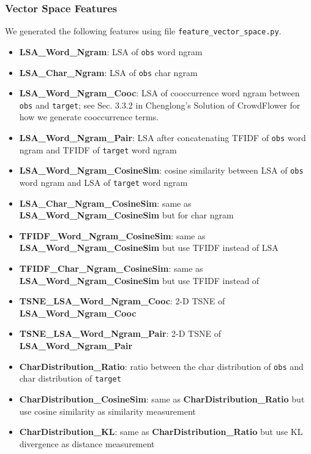 \documentclass[12pt]{article}
\begin{document}
\subsubsection{Vector Space Features}
We generated the following features using file \texttt{feature\_vector\_space.py}.
\begin{itemize}
\item \textbf{LSA\_Word\_Ngram}: LSA of \texttt{obs} word ngram
\item \textbf{LSA\_Char\_Ngram}: LSA of \texttt{obs} char ngram
\item \textbf{LSA\_Word\_Ngram\_Cooc}: LSA of cooccurrence word ngram between \texttt{obs} and \texttt{target}; see Sec. 3.3.2 in Chenglong's Solution of CrowdFlower\cite{CrowdFlower_1st} for how we generate cooccurrence terms.
\item \textbf{LSA\_Word\_Ngram\_Pair}: LSA after concatenating TFIDF of \texttt{obs} word ngram and TFIDF of \texttt{target} word ngram
\item \textbf{LSA\_Word\_Ngram\_CosineSim}: cosine similarity between LSA of \texttt{obs} word ngram and LSA of \texttt{target} word ngram
\item \textbf{LSA\_Char\_Ngram\_CosineSim}: same as \textbf{LSA\_Word\_Ngram\_CosineSim} but for char ngram
\item \textbf{TFIDF\_Word\_Ngram\_CosineSim}: same as \textbf{LSA\_Word\_Ngram\_CosineSim} but use TFIDF instead of LSA
\item \textbf{TFIDF\_Char\_Ngram\_CosineSim}: same as \textbf{LSA\_Word\_Ngram\_CosineSim} but use TFIDF instead of
\item \textbf{TSNE\_LSA\_Word\_Ngram\_Cooc}: 2-D TSNE of \textbf{LSA\_Word\_Ngram\_Cooc}
\item \textbf{TSNE\_LSA\_Word\_Ngram\_Pair}: 2-D TSNE of \textbf{LSA\_Word\_Ngram\_Pair}
\item \textbf{CharDistribution\_Ratio}: ratio between the char distribution of \texttt{obs} and char distribution of \texttt{target}
\item \textbf{CharDistribution\_CosineSim}: same as \textbf{CharDistribution\_Ratio} but use cosine similarity as similarity measurement
\item \textbf{CharDistribution\_KL}: same as \textbf{CharDistribution\_Ratio} but use KL divergence as distance measurement
\end{itemize}
\end{document}
